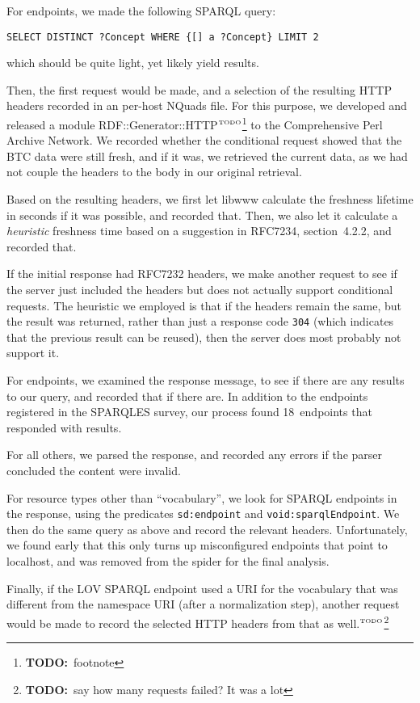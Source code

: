 \documentclass{llncs}
\newcommand{\rdfterm}[1]{\texttt{#1}}
\newcommand{\httph}[1]{\texttt{#1}}
\newcommand{\todo}[1]{\ensuremath{^{\textrm{\tiny{TODO}\normalsize}}}\footnote{\textbf{TODO:}~#1}}
\begin{document}
\begin{subappendices}
For endpoints, we made the following SPARQL query:
\begin{verbatim}
SELECT DISTINCT ?Concept WHERE {[] a ?Concept} LIMIT 2
\end{verbatim}
which should be quite light, yet likely yield results.

Then, the first request would be made, and a selection of the
resulting HTTP headers recorded in an per-host NQuads file. For this
purpose, we developed and released a module
RDF::Generator::HTTP\todo{footnote} to the Comprehensive Perl Archive
Network. We recorded whether the conditional request showed that the
BTC data were still fresh, and if it was, we retrieved the current
data, as we had not couple the headers to the body in our original
retrieval.

Based on the resulting headers, we first let libwww calculate the
freshness lifetime in seconds if it was possible, and recorded
that. Then, we also let it calculate a \emph{heuristic} freshness
time based on a suggestion in RFC7234, section~4.2.2, and recorded that.

If the initial response had RFC7232 headers, we make another
request to see if the server just included the headers but does not
actually support conditional requests. The heuristic we employed is
that if the headers remain the same, but the result was returned,
rather than just a response code \httph{304} (which indicates that the
previous result can be reused), then the server does most probably not
support it.

For endpoints, we examined the response message, to see if there are
any results to our query, and recorded that if there are. In addition
to the endpoints registered in the SPARQLES survey, our process found
18~endpoints that responded with results.

For all others, we parsed the response, and recorded any errors if the
parser concluded the content were invalid.

For resource types other than ``vocabulary'', we look for SPARQL
endpoints in the response, using the predicates \rdfterm{sd:endpoint}
and \rdfterm{void:sparqlEndpoint}. We then do the same query as above
and record the relevant headers. Unfortunately, we found early that
this only turns up misconfigured endpoints that point to localhost,
and was removed from the spider for the final analysis.

Finally, if the LOV SPARQL endpoint used a URI for the vocabulary that
was different from the namespace URI (after a normalization step),
another request would be made to record the selected HTTP headers from
that as well.\todo{say how many requests failed? It was a lot}
\end{subappendices}
\end{document}
